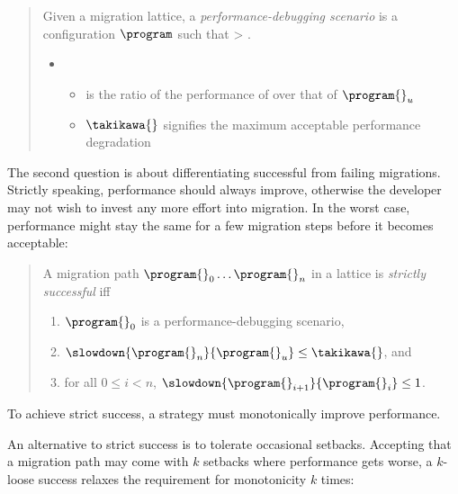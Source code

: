 \begin{quote} \em

Given a migration lattice, a \emph{performance-debugging scenario} is a
  configuration $\program$ such that  > \takikawa{}.
  \begin{itemize} \item[] \begin{itemize}
    \item
       is the ratio of the performance of
      \program{} over that of $\program{}_u$
    \item
      $\takikawa{}$ signifies the maximum acceptable performance degradation
  \end{itemize} \end{itemize}
\end{quote}

The second question is about differentiating successful from failing migrations.
Strictly speaking, performance should
always improve, otherwise the developer may not wish to invest any more effort
into migration.
In the worst case, performance might stay the same for a few
migration steps before it becomes acceptable:

\begin{quote} \em

A migration path ${\program{}_0} \ldots {\program{}_n}$ in a lattice 
is \emph{strictly successful}
iff
\begin{enumerate}
  \item $\program{}_0$ is a performance-debugging scenario,
  \item $\slowdown{\program{}_n}{\program{}_u} \leq \takikawa{}$, and 
  \item for all $0 \leq i < n$, $\slowdown{\program{}_{i+1}}{\program{}_{i}} \leq 1$.
 \end{enumerate} 
\end{quote}
To achieve strict success, a strategy must monotonically improve performance.

An alternative to strict success is to tolerate occasional setbacks.
Accepting that a migration path may come with $k$ setbacks where performance
gets worse, a $k$-loose success relaxes the requirement for monotonicity $k$
times:

